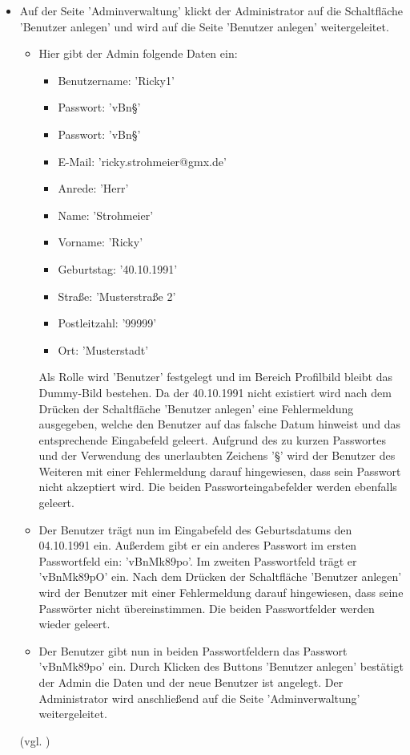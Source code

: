 \documentclass[a4paper]{scrreprt}
\begin{document}
\begin{itemize}
				\item {} 
				 Auf der Seite 'Adminverwaltung' klickt der Administrator auf die Schaltfläche 'Benutzer anlegen' und wird auf die Seite 'Benutzer anlegen' weitergeleitet. 
					 \begin{itemize}
					 \item Hier gibt der Admin folgende Daten ein:
						\begin{itemize}
							\item Benutzername: 'Ricky1' 
							\item Passwort: 'vBn§'
							\item Passwort: 'vBn§'
							\item E-Mail: 'ricky.strohmeier@gmx.de'
							\item Anrede: 'Herr'
							\item Name: 'Strohmeier'
							\item Vorname: 'Ricky'
							\item Geburtstag: '40.10.1991'
							\item Straße: 'Musterstraße 2'
							\item Postleitzahl: '99999'
							\item Ort: 'Musterstadt'
						\end{itemize}
					 Als Rolle wird 'Benutzer' festgelegt und im Bereich Profilbild bleibt das Dummy-Bild bestehen. Da der 40.10.1991 nicht existiert wird nach dem Drücken der Schaltfläche 'Benutzer anlegen' eine Fehlermeldung ausgegeben, welche den Benutzer auf das falsche Datum hinweist und das entsprechende Eingabefeld geleert. Aufgrund des zu kurzen Passwortes und der Verwendung des unerlaubten Zeichens '§' wird der Benutzer des Weiteren mit einer Fehlermeldung darauf hingewiesen, dass sein Passwort nicht akzeptiert wird. Die beiden Passworteingabefelder werden ebenfalls geleert.
					 
					 \item Der Benutzer trägt nun im Eingabefeld des Geburtsdatums den 04.10.1991 ein. Außerdem gibt er ein anderes Passwort im ersten Passwortfeld ein: 'vBnMk89po'. Im zweiten Passwortfeld trägt er 'vBnMk89pO' ein. Nach dem Drücken der Schaltfläche 'Benutzer anlegen' wird der Benutzer mit einer Fehlermeldung darauf hingewiesen, dass seine Passwörter nicht übereinstimmen. Die beiden Passwortfelder werden wieder geleert.
					 
					 \item Der Benutzer gibt nun in beiden Passwortfeldern das Passwort 'vBnMk89po' ein. Durch Klicken des Buttons 'Benutzer anlegen' bestätigt der Admin die Daten und der neue Benutzer ist angelegt. Der Administrator wird anschließend auf die Seite 'Adminverwaltung' weitergeleitet.
					\end{itemize}
				(vgl. )
					

\end{itemize}
\end{document}
